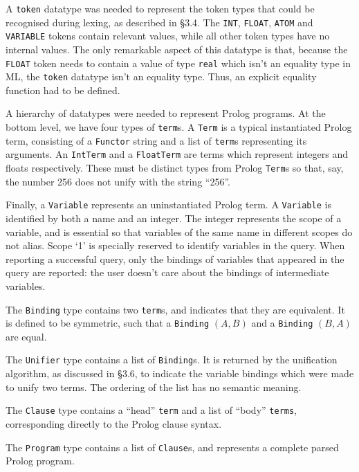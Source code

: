 \documentclass[12pt]{article}
\begin{document}

A \verb|token| datatype was needed to represent the token types that could be recognised during lexing, as described in \S3.4. 
The \verb|INT|, \verb|FLOAT|, \verb|ATOM| and \verb|VARIABLE| tokens contain relevant values, while all other token types have no internal values. 
The only remarkable aspect of this datatype is that, because the \verb|FLOAT| token needs to contain a value of type \verb|real| which isn't an equality type in ML, the \verb|token| datatype isn't an equality type. 
Thus, an explicit equality function had to be defined.

A hierarchy of datatypes were needed to represent Prolog programs. 
At the bottom level, we have four types of \verb|term|s. A \verb|Term| is a typical instantiated Prolog term, consisting of a \verb|Functor| string and a list of \verb|term|s representing its arguments. 
An \verb|IntTerm| and a \verb|FloatTerm| are terms which represent integers and floats respectively. 
These must be distinct types from Prolog \verb|Term|s so that, say, the number 256 does not unify with the string ``256''. 

Finally, a \verb|Variable| represents an uninstantiated Prolog term. 
A \verb|Variable| is identified by both a name and an integer. 
The integer represents the scope of a variable, and is essential so that variables of the same name in different scopes do not alias. 
Scope `1' is specially reserved to identify variables in the query. 
When reporting a successful query, only the bindings of variables that appeared in the query are reported: the user doesn't care about the bindings of intermediate variables.

The \verb|Binding| type contains two \verb|term|s, and indicates that they are equivalent. 
It is defined to be symmetric, such that a \verb|Binding| $(A,B)$ and a \verb|Binding| $(B,A)$ are equal.

The \verb|Unifier| type contains a list of \verb|Binding|s. 
It is returned by the unification algorithm, as discussed in \S3.6, to indicate the variable bindings which were made to unify two terms. 
The ordering of the list has no semantic meaning.

The \verb|Clause| type contains a ``head'' \verb|term| and a list of ``body'' \verb|terms|, corresponding directly to the Prolog clause syntax.

The \verb|Program| type contains a list of \verb|Clause|s, and represents a complete parsed Prolog program.
\end{document}
